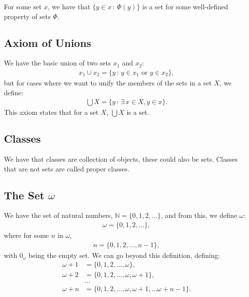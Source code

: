 For some set $x$, we have that $\{y \in x \, : \, \Phi(y)\}$ is a set
for some well-defined property of sets $\Phi$.

\newpage

\subsection{Axiom of Unions}

We have the basic union of two sets $x_1$ and $x_2$: \begin{align*}
    x_1 \cup x_2 = \{y \, : \, y \in x_1 \text{ or } y \in x_2\},
\end{align*} but for cases where we want to unify the members of the sets in
a set $X$, we define: \begin{align*}
    \bigcup X = \{y \, : \, \exists \, x \in X, y \in x\}.
\end{align*} This axiom states that for a set $X$, $\bigcup X$ is a set. 

\subsection{Classes}

We have that classes are collection of objects, these could also be sets.
Classes that are not sets are called proper classes.

\subsection{The Set $\omega$}

We have the set of natural numbers, $\mathbb{N} = \{0, 1, 2, \ldots\}$,
and from this, we define $\omega$: \begin{align*}
    \omega = \{0, 1, 2, \ldots\},
\end{align*} where for some $n$ in $\omega$, \begin{align*}
    n = \{0, 1, 2, \ldots, n - 1\},
\end{align*} with $0_\omega$ being the empty set. We can go beyond this
definition, defining: \begin{align*}
    \omega + 1 &= \{0, 1, 2, \ldots, \omega\}, \\
    \omega + 2 &= \{0, 1, 2, \ldots, \omega, \omega + 1\}, \\
    &\ldots \\
    \omega + n &= \{0, 1, 2, \ldots, \omega, \omega + 1, \ldots \omega + n - 1\}.
\end{align*}

